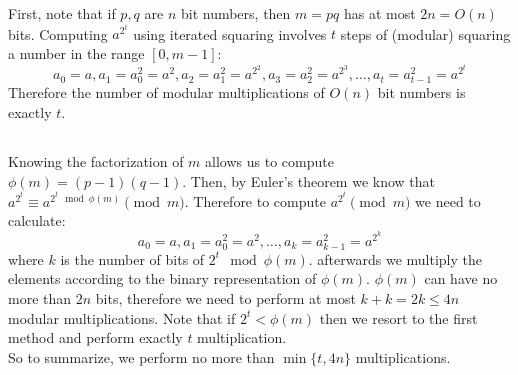 \documentclass{article}
\begin{document}
\section{} %

\subsection{} %
First, note that if $p,q$ are $n$ bit numbers, then $m=pq$ has at most $2n=O(n)$ bits.
Computing $a^{2^t}$ using iterated squaring involves $t$ steps of (modular) squaring a number in the range $[0,m-1]$: \[
a_0=a, a_1=a_0^2=a^2, a_2=a_1^2=a^{2^2}, a_3=a_2^2=a^{2^3}, \ldots, a_t=a_{t-1}^2=a^{2^t}
\]
Therefore the number of modular multiplications of $O(n)$ bit numbers is exactly $t$.

\subsection{} %
Knowing the factorization of $m$ allows us to compute $\phi(m)=(p-1)(q-1)$. Then, by Euler's theorem we know that $a^{2^t} \equiv a^{2^t \mod{\phi(m)}} \pmod{m}$. Therefore to compute $a^{2^t} \pmod{m}$ we need to calculate: \[
a_0=a, a_1=a_0^2=a^2, \ldots, a_k=a_{k-1}^2=a^{2^k}
\]
where $k$ is the number of bits of $2^t \mod \phi(m)$.
afterwards we multiply the elements according to the binary representation of $\phi(m)$.
$\phi(m)$ can have no more than $2n$ bits, therefore we need to perform at most $k+k = 2k \le 4n$ modular multiplications.
Note that if $2^t < \phi(m)$ then we resort to the first method and perform exactly $t$ multiplication. \\
So to summarize, we perform no more than $\min \{ t, 4n \}$ multiplications.
\end{document}
